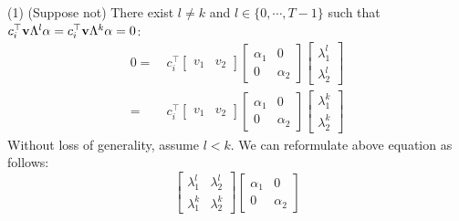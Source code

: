 \documentclass[twocolumn]{autart}    %
\begin{document}
{\begin{pf}
(1) %
 (Suppose not) %
There exist $l \neq k$ and $l \in \{ 0, \cdots, T-1 \}$ such that $c_i^\top {\bf v} \Lambda^l \alpha = c_i^\top {\bf v} \Lambda^k \alpha= 0$:
\begin{equation}
\begin{aligned}
0 = ~& c_i^\top \begin{bmatrix} v_1 & v_2 \end{bmatrix} \begin{bmatrix} \alpha_1 & 0 \\ 0 & \alpha_2 \end{bmatrix} \begin{bmatrix} \lambda_1^l \\ \lambda_2^l \end{bmatrix} \\
= ~ & c_i^\top \begin{bmatrix} v_1 & v_2 \end{bmatrix} \begin{bmatrix} \alpha_1 & 0 \\ 0 & \alpha_2 \end{bmatrix} \begin{bmatrix} \lambda_1^k \\ \lambda_2^k \end{bmatrix} \nonumber
\end{aligned}
\end{equation}
Without loss of generality, assume $l<k$. We can reformulate above equation as follows:
\begin{equation}
	\begin{bmatrix} \lambda_1^{l} & \lambda_2^l \\ \lambda_1^k & \lambda_2^k \end{bmatrix} \begin{bmatrix} \alpha_1 & 0 \\ 0 & \alpha_2 \end{bmatrix} 

\end{equation}
\end{pf}}
\end{document}
